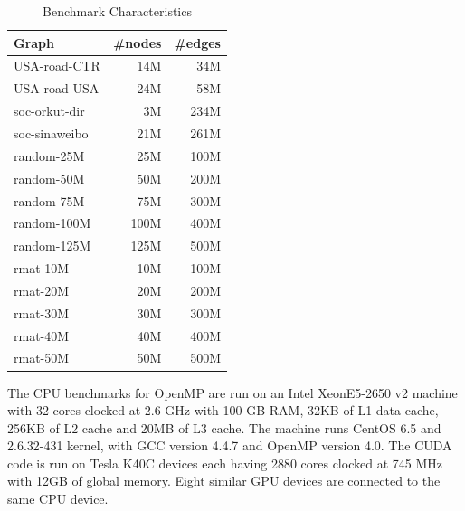 \documentclass[12pt]{article}
\begin{document}
\begin{table}
\centering
\begin{tabular}{|l|r|r|}
\hline
Graph & \#nodes   & \#edges \\
\hline
USA-road-CTR   & 14M & 34M \\
USA-road-USA   & 24M & 58M \\
soc-orkut-dir  & 3M  & 234M \\
soc-sinaweibo  & 21M & 261M \\
random-25M  & 25M & 100M \\
random-50M  & 50M & 200M \\
random-75M  & 75M & 300M \\
random-100M & 100M   & 400M \\
random-125M & 125M   & 500M \\
rmat-10M & 10M & 100M \\
rmat-20M & 20M & 200M \\
rmat-30M & 30M & 300M \\
rmat-40M & 40M & 400M \\
rmat-50M & 50M & 500M \\
\hline
\end{tabular}
\caption{Benchmark Characteristics}
\label{expt:chars}
\end{table}

The CPU benchmarks for OpenMP are run on an Intel XeonE5-2650 v2 machine with 32 cores clocked at 2.6 GHz with 100 GB RAM, 32KB of L1 data cache, 256KB of L2 cache and 20MB of L3 cache. The machine runs CentOS 6.5 and 2.6.32-431 kernel, with GCC version 4.4.7 and OpenMP version 4.0. The CUDA code is run on Tesla K40C devices each having 2880 cores clocked at 745 MHz with 12GB of global memory. Eight similar GPU devices are connected to the same CPU device.
\end{document}
